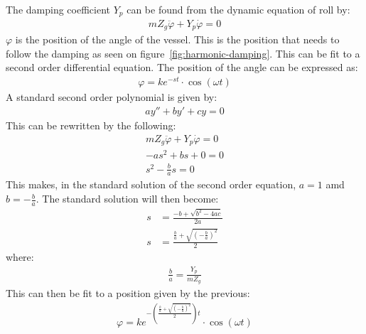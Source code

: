 The damping coefficient $Y_p$ can be found from the dynamic equation of roll by:
\begin{align}
mZ_g\ddot \varphi + Y_p\dot \varphi = 0
\end{align}
$\varphi$ is the position of the angle of the vessel. This is the position that needs to follow the damping as seen on figure~\vref{fig:harmonic-damping}. This can be fit to a second order differential equation. The position of the angle can be expressed as:
\begin{align}
\varphi = ke^{-st} \cdot \cos(\omega t)
\end{align}
A standard second order polynomial is given by:
\begin{align}
ay''+by'+cy = 0
\end{align}
This can be rewritten by the following:
\begin{align}
mZ_g\ddot \varphi + Y_p\dot \varphi = 0\\
-as^2+bs+0=0\\
s^2-\frac{b}{a}s=0
\end{align}
This makes, in the standard solution of the second order equation, $a=1$ amd $b=-\frac{b}{a}$. The standard solution will then become:
\begin{align}
s &= \frac{-b+\sqrt{b^2-4ac}}{2a}\\
s &= \frac{\frac{b}{a}+\sqrt{(-\frac{b}{a})^2}}{2}
\end{align}
where:
\begin{align}
\frac{b}{a} = \frac{Y_p}{mZ_g}
\end{align}
This can then be fit to a position given by the previous:
\begin{align}
\varphi = ke^{-\left(\frac{\frac{b}{a}+\sqrt{(-\frac{b}{a})^2}}{2}\right)t} \cdot \cos(\omega t)
\end{align}

